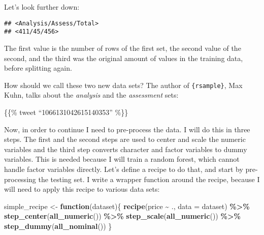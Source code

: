 \documentclass[
]{article}
\newenvironment{Shaded}{\begin{snugshade}}{\end{snugshade}}
\newcommand{\ControlFlowTok}[1]{\textcolor[rgb]{0.13,0.29,0.53}{\textbf{#1}}}
\newcommand{\DataTypeTok}[1]{\textcolor[rgb]{0.13,0.29,0.53}{#1}}
\newcommand{\DecValTok}[1]{\textcolor[rgb]{0.00,0.00,0.81}{#1}}
\newcommand{\KeywordTok}[1]{\textcolor[rgb]{0.13,0.29,0.53}{\textbf{#1}}}
\newcommand{\NormalTok}[1]{#1}
\newcommand{\OperatorTok}[1]{\textcolor[rgb]{0.81,0.36,0.00}{\textbf{#1}}}
\newcommand{\StringTok}[1]{\textcolor[rgb]{0.31,0.60,0.02}{#1}}
\begin{document}
Let's look further down:

\begin{Shaded}
\end{Shaded}

\begin{verbatim}
## <Analysis/Assess/Total>
## <411/45/456>
\end{verbatim}

The first value is the number of rows of the first set, the second value of the second, and the third
was the original amount of values in the training data, before splitting again.

How should we call these two new data sets? The author of \texttt{\{rsample\}}, Max Kuhn, talks about
the \emph{analysis} and the \emph{assessment} sets:

\{\{\% tweet ``1066131042615140353'' \%\}\}

Now, in order to continue I need to pre-process the data. I will do this in three steps.
The first and the second steps are used to center and scale the numeric variables and the third step
converts character and factor variables to dummy variables. This is needed because I will train a
random forest, which cannot handle factor variables directly. Let's define a recipe to do that,
and start by pre-processing the testing set. I write a wrapper function around the recipe,
because I will need to apply this recipe to various data sets:

\begin{Shaded}
\begin{Highlighting}[]
\NormalTok{simple\_recipe \textless{}{-}}\StringTok{ }\ControlFlowTok{function}\NormalTok{(dataset)\{}
    \KeywordTok{recipe}\NormalTok{(price }\OperatorTok{\textasciitilde{}}\StringTok{ }\NormalTok{., }\DataTypeTok{data =}\NormalTok{ dataset) }\OperatorTok{\%\textgreater{}\%}
\StringTok{        }\KeywordTok{step\_center}\NormalTok{(}\KeywordTok{all\_numeric}\NormalTok{()) }\OperatorTok{\%\textgreater{}\%}
\StringTok{        }\KeywordTok{step\_scale}\NormalTok{(}\KeywordTok{all\_numeric}\NormalTok{()) }\OperatorTok{\%\textgreater{}\%}
\StringTok{        }\KeywordTok{step\_dummy}\NormalTok{(}\KeywordTok{all\_nominal}\NormalTok{())}
\NormalTok{\}}
\end{Highlighting}
\end{Shaded}
\end{document}
